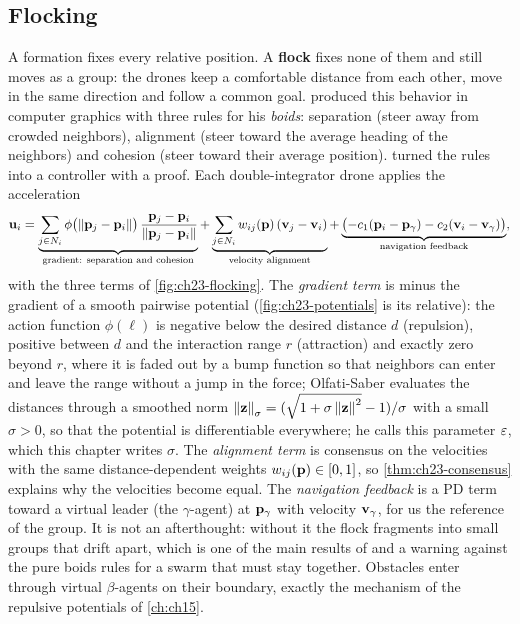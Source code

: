\subsection{Flocking}
\label{sec:ch23-flocking}

A formation fixes every relative position. A \textbf{flock}
fixes none of them and still moves as a group: the drones keep a comfortable
distance from each other, move in the same direction and follow a common
goal. \textcite{reynolds1987flocks} produced this behavior in computer
graphics with three rules for his \emph{boids}: separation
(steer away from crowded neighbors), alignment (steer toward the average
heading of the neighbors) and cohesion (steer toward their average
position). \textcite{olfatisaber2006flocking} turned the rules into a
controller with a proof. Each double-integrator drone applies the acceleration
\begin{equation}
  \mathbf{u}_i = \underbrace{\sum_{j \in N_i} \phi\bigl(\left\lVert \mathbf{p}_j - \mathbf{p}_i \right\rVert\bigr)\,
  \frac{\mathbf{p}_j - \mathbf{p}_i}{\left\lVert \mathbf{p}_j - \mathbf{p}_i \right\rVert}}_{\text{gradient: separation and cohesion}}
  + \underbrace{\sum_{j \in N_i} w_{ij}(\mathbf{p})\,(\mathbf{v}_j - \mathbf{v}_i)}_{\text{velocity alignment}}
  + \underbrace{\bigl(-c_1(\mathbf{p}_i - \mathbf{p}_\gamma) - c_2(\mathbf{v}_i - \mathbf{v}_\gamma)\bigr)}_{\text{navigation feedback}},
  \label{eq:ch23-flock}
\end{equation}
with the three terms of \cref{fig:ch23-flocking}. The \emph{gradient term} is
minus the gradient of a smooth pairwise potential (\cref{fig:ch23-potentials}
is its relative): the action function $\phi(\ell)$ is negative below the
desired distance $d$ (repulsion), positive between $d$ and the interaction
range $r$ (attraction) and exactly zero beyond $r$, where it is faded out by a
bump function so that neighbors can enter and leave the range without a jump
in the force; Olfati-Saber evaluates the distances through a smoothed norm
$\left\lVert \mathbf{z} \right\rVert_\sigma = (\sqrt{1 + \sigma\left\lVert \mathbf{z} \right\rVert^2} - 1)/\sigma$ with a
small $\sigma > 0$, so that the potential is differentiable everywhere; he calls
this parameter $\varepsilon$, which this chapter writes $\sigma$. The \emph{alignment term} is
consensus on the velocities with the same distance-dependent weights
$w_{ij}(\mathbf{p}) \in [0, 1]$, so \cref{thm:ch23-consensus} explains why the
velocities become equal. The \emph{navigation feedback} is a PD term toward a
virtual leader (the $\gamma$-agent) at $\mathbf{p}_\gamma$ with velocity
$\mathbf{v}_\gamma$, for us the \cbs reference of the group. It is not an
afterthought: without it the flock fragments into small groups that drift
apart, which is one of the main results of \textcite{olfatisaber2006flocking}
and a warning against the pure boids rules for a swarm that must stay
together. Obstacles enter through virtual $\beta$-agents on their boundary,
exactly the mechanism of the repulsive potentials of \cref{ch:ch15}.

